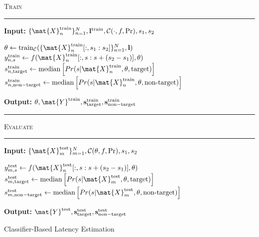 \begin{algorithm}[H]
	\textsc{Train}
	\smallskip \hrule \smallskip
	\textbf{Input:} $\{\mat{X}_n^\mathrm{train}\}_{n=1}^N,
  \mathbf{l}^\mathrm{train}, \mathcal{C}(\cdot,f, \Pr), s_1, s_2$
  \begin{algorithmic}[1]
		\State $\theta \gets
			\mathrm{train}_\mathcal{C}(\{\mat{X}_n^\mathrm{train}[:,s_1:s_2]\}_{n=1}^N,\mathbf{l})$
      \State $y_{n,s}^\mathrm{train} \gets f(\mat{X}_n^\mathrm{train}[:,s:s+(s_2-s_1)],\theta)$
        \EndFor
        \State $s_{n,\mathrm{target}}^\mathrm{train} \gets
			    \mathrm{median}\left[Pr(s|\mat{X}_n^\mathrm{train},\theta,\mathrm{target})\right]$
		    \State $s_{n,\mathrm{non-target}}^\mathrm{train}\gets
			    \mathrm{median}\left[Pr(s|\mat{X}_n^\mathrm{train},\theta,\textrm{non-target})\right]$
    \EndFor
	\end{algorithmic}
  \textbf{Output:} $\theta,
  \mat{Y}^\mathrm{train},
  \mathbf{s}_\mathrm{target}^\mathrm{train},
  \mathbf{s}_\mathrm{non-target}^\mathrm{train}$
	\smallskip \hrule \smallskip
	\textsc{Evaluate}
	\smallskip \hrule \smallskip
	\textbf{Input:} $\{\mat{X}_m^\mathrm{test}\}_{m=1}^N, \mathcal{C}(\theta,f, \Pr), s_1, s_2$
  \begin{algorithmic}[1]
      \State $y_{m,s}^\mathrm{test} \gets f(\mat{X}_n^\mathrm{test}[:,s:s+(s_2-s_1)],\theta)$
        \EndFor
        \State $s_{m,\mathrm{target}}^\mathrm{test} \gets
			    \mathrm{median}\left[Pr(s|\mat{X}_m^\mathrm{test},\theta,\mathrm{target})\right]$
		    \State $s_{m,\mathrm{non-target}}^\mathrm{test}\gets
			    \mathrm{median}\left[Pr(s|\mat{X}_m^\mathrm{test},\theta,\textrm{non-target})\right]$
    \EndFor
	\end{algorithmic}
  \textbf{Output:} $\mat{Y}^\mathrm{test},
  \mathbf{s}_\mathrm{target}^\mathrm{test},
  \mathbf{s}_\mathrm{non-target}^\mathrm{test}$

	\caption{Classifier-Based Latency Estimation}
	\label{alg:cble}
\end{algorithm}

